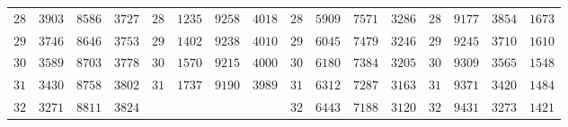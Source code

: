\begin{GaussVISolarFrame}
\begin{tabular}{r|r|r|r||r|r|r|r||r|r|r|r||r|r|r|r}
$28$ & $3903$ & $8586$ & $3727$ & $28$ & $1235$ & $9258$ & $4018$ & $28$ & $5909$ & $7571$ & $3286$ & $28$ & $9177$ & $3854$ & $1673$\\
$29$ & $3746$ & $8646$ & $3753$ & $29$ & $1402$ & $9238$ & $4010$ & $29$ & $6045$ & $7479$ & $3246$ & $29$ & $9245$ & $3710$ & $1610$\\
$30$ & $3589$ & $8703$ & $3778$ & $30$ & $1570$ & $9215$ & $4000$ & $30$ & $6180$ & $7384$ & $3205$ & $30$ & $9309$ & $3565$ & $1548$\\[3pt]
$31$ & $3430$ & $8758$ & $3802$ & $31$ & $1737$ & $9190$ & $3989$ & $31$ & $6312$ & $7287$ & $3163$ & $31$ & $9371$ & $3420$ & $1484$\\
$32$ & $3271$ & $8811$ & $3824$ &  &  &  &  & $32$ & $6443$ & $7188$ & $3120$ & $32$ & $9431$ & $3273$ & $1421$\\
\end{tabular}\endgroup
\end{GaussVISolarFrame}
\par\clearpage
\thispagestyle{empty}
\noindent{}%
\par\nobreak\smallskip
